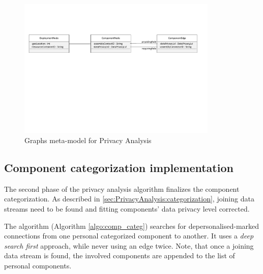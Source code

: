 \begin{figure}[h]
	\centering
	\includegraphics[trim = 00mm 120mm 15mm 50mm, clip, width=0.85\textwidth]{pictures/modelGraph_metamodel}
	\caption{Graphs meta-model for Privacy Analysis}
	\label{fig:privacy_graph_mm}
\end{figure}


\subsection{Component categorization implementation}

The second phase of the privacy analysis algorithm finalizes the component categorization. As described in \autoref{sec:PrivacyAnalysis:categorization}, joining data streams need to be found and fitting components' data privacy level corrected.

The algorithm (Algorithm \ref{algo:comp_categ}) searches for depersonalised-marked connections from one personal categorized component to another. It uses a \textit{deep search first} approach, while never using an edge twice. Note, that once a joining data stream is found, the involved components are appended to the list of personal components.

